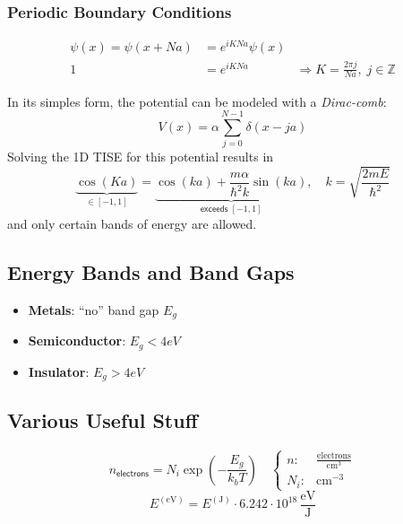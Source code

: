 \subsubsection{Periodic Boundary Conditions}
\noindent\begin{align*}
    \psi(x) = \psi(x+Na) & = e^{iKNa}\psi(x)                                                       \\
    1                    & =e^{iKNa}         & \Rightarrow K=\frac{2\pi j}{Na}, \; j\in \mathbb{Z}
\end{align*}


In its simples form, the potential can be modeled with a \textit{Dirac-comb}:
\noindent\begin{equation*}
    V(x)=\alpha\sum_{j=0}^{N-1}\delta(x-ja)
\end{equation*}
Solving the 1D TISE for this potential results in
\noindent\begin{equation*}
    \underbrace{\cos(Ka)}_{\in [-1,1]} = \underbrace{\cos(ka) + \frac{m\alpha}{\hbar^2 k}\sin(ka)}_{\textsf{exceeds }[-1,1]}, \quad k=\sqrt{\frac{2mE}{\hbar^2}}
\end{equation*}
and only certain bands of energy are allowed.

\subsection{Energy Bands and Band Gaps}
\begin{itemize}
    \item \textbf{Metals}: ``no'' band gap $E_g$
    \item \textbf{Semiconductor}: $E_g < 4eV$
    \item \textbf{Insulator}: $E_g > 4eV$
\end{itemize}

\subsection{Various Useful Stuff}
\noindent\begin{equation*}
    n_{\mathsf{electrons}} = N_i \exp\left(-\frac{E_g}{k_b T}\right)\quad \begin{cases}
        n:   & \mathrm{\frac{electrons}{cm^3}} \\
        N_i: & \mathrm{cm^{-3}}
    \end{cases}
\end{equation*}
\noindent\begin{equation*}
    E^{(\mathrm{eV})} = E^{(\mathrm{J})} \cdot 6.242 \cdot 10^{18}\, \mathrm{\frac{eV}{J}}
\end{equation*}